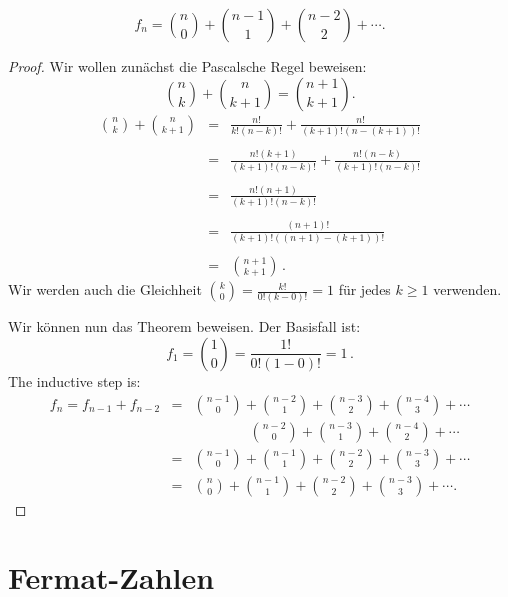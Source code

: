 
\begin{theorem}
\[
f_n = \binom{n}{0} + \binom{n-1}{1} + \binom{n-2}{2} + \cdots.
\]
\end{theorem}

\begin{proof}
Wir wollen zunächst die Pascalsche Regel beweisen:
\[
\binom{n}{k} + \binom{n}{k+1} = \binom{n+1}{k+1}.
\]
\begin{eqnarray*}
\binom{n}{k} + \binom{n}{k+1} &=& \frac{n!}{k!(n-k)!} + \frac{n!}{(k+1)!(n-(k+1))!}\\
\\
&=&\frac{n!(k+1)}{(k+1)!(n-k)!}+\frac{n!(n-k)}{(k+1)!(n-k)!}\\\\
&=&\frac{n!(n+1)}{(k+1)!(n-k)!}\\\\
&=&\frac{(n+1)!}{(k+1)!((n+1)-(k+1))!}\\\\
&=&\binom{n+1}{k+1}\,.
\end{eqnarray*}
Wir werden auch die Gleichheit $\displaystyle\binom{k}{0} = \frac{k!}{0!(k-0)!} = 1$ für jedes $k\geq 1$ verwenden.

Wir können nun das Theorem beweisen. Der Basisfall ist:
\[
f_1 =  \binom{1}{0} = \frac{1!}{0!(1-0)!}=1\,.
\]
The inductive step is:
\begin{eqnarray*}
f_n=f_{n-1} + f_{n-2} &=& \binom{n-1}{0} + \binom{n-2}{1} + \binom{n-3}{2} + \binom{n-4}{3} + \cdots\\
&&\quad\quad\quad\quad\binom{n-2}{0} + \binom{n-3}{1} + \binom{n-4}{2} + \cdots\\
&=&\binom{n-1}{0} + \binom{n-1}{1} + \binom{n-2}{2} + \binom{n-3}{3} + \cdots\\
&=&\binom{n}{0} + \binom{n-1}{1} + \binom{n-2}{2} + \binom{n-3}{3} + \cdots.
\end{eqnarray*}

\end{proof}



\section{Fermat-Zahlen}\label{s.induction-fermat}


